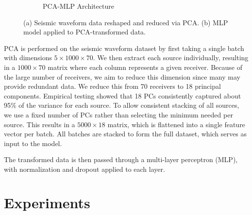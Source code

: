 \documentclass{article}
\newcommand{\instructions}[1]{{\color{blue} #1}}
\begin{document}
\begin{figure}
\begin{subfigure}[b]{0.45\linewidth}
        \caption{PCA-MLP Architecture}
    \end{subfigure}
    \caption{(a) Seismic waveform data reshaped and reduced via PCA. (b) MLP model applied to PCA-transformed data.}
    \label{fig:pca}
\end{figure}

PCA is performed on the seismic waveform dataset by first taking a single batch with dimensions $5 \times 1000 \times 70$. We then extract each source individually, resulting in a $1000 \times 70$ matrix where each column represents a given receiver. Because of the large number of receivers, we aim to reduce this dimension since many may provide redundant data. We reduce this from 70 receivers to 18 principal components. Empirical testing showed that 18 PCs consistently captured about 95\% of the variance for each source. To allow consistent stacking of all sources, we use a fixed number of PCs rather than selecting the minimum needed per source. This results in a $5000 \times 18$ matrix, which is flattened into a single feature vector per batch. All batches are stacked to form the full dataset, which serves as input to the model.

The transformed data is then passed through a multi-layer perceptron (MLP), with normalization and dropout applied to each layer.

\section{Experiments}
\end{document}
